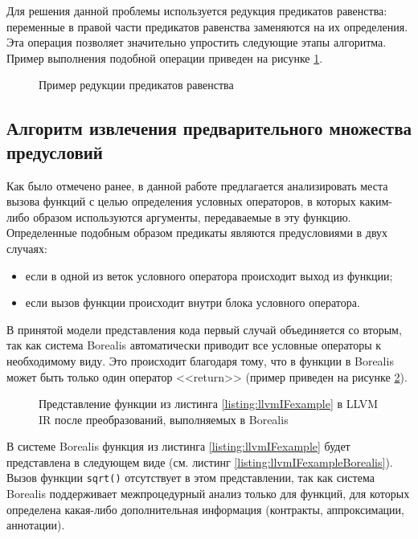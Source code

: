 Для решения данной проблемы используется редукция предикатов равенства: переменные в правой части предикатов равенства заменяются на их определения. Эта операция позволяет значительно упростить следующие этапы алгоритма. Пример выполнения подобной операции приведен на рисунке \ref{image:equalityMapperExample}.
\begin{figure}[h!]
\caption{Пример редукции предикатов равенства}
\label{image:equalityMapperExample}
\end{figure}

\subsection{Алгоритм извлечения предварительного множества предусловий}
\label{subsection:extraction}
Как было отмечено ранее, в данной работе предлагается анализировать места вызова функций с целью определения условных операторов, в которых каким-либо образом используются аргументы, передаваемые в эту функцию. Определенные подобным образом предикаты являются предусловиями в двух случаях:
\begin{itemize}
\item если в одной из веток условного оператора происходит выход из функции;
\item если вызов функции происходит внутри блока условного оператора.
\end{itemize}

В принятой модели представления кода первый случай объединяется со вторым, так как система Borealis автоматически приводит все условные операторы к необходимому виду. Это происходит благодаря тому, что в функции в Borealis может быть только один оператор <<return>> (пример приведен на рисунке \ref{image:llvmIFcfg}).

 	
\begin{figure}[h!]
\caption{Представление функции из листинга \ref{listing:llvmIFexample} в LLVM IR после преобразований, выполняемых в Borealis}
\label{image:llvmIFcfg}
\end{figure}

В системе Borealis функция из листинга \ref{listing:llvmIFexample} будет представлена в следующем виде (см. листинг \ref{listing:llvmIFexampleBorealis}). Вызов функции \texttt{sqrt()} отсутствует в этом представлении, так как система Borealis поддерживает межпроцедурный анализ только для функций, для которых определена какая-либо дополнительная информация (контракты, аппроксимации, аннотации).



